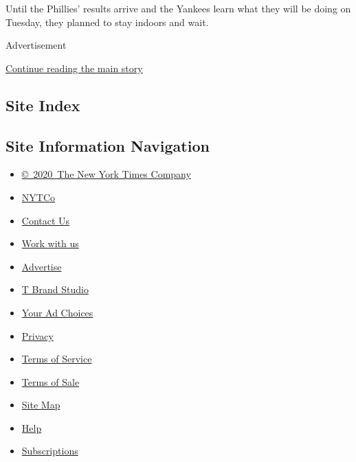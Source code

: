 Until the Phillies' results arrive and the Yankees learn what they will
be doing on Tuesday, they planned to stay indoors and wait.

Advertisement

\protect\hyperlink{after-bottom}{Continue reading the main story}

\hypertarget{site-index}{%
\subsection{Site Index}\label{site-index}}

\hypertarget{site-information-navigation}{%
\subsection{Site Information
Navigation}\label{site-information-navigation}}

\begin{itemize}
\tightlist
\item
  \href{https://help.nytimes3xbfgragh.onion/hc/en-us/articles/115014792127-Copyright-notice}{©~2020~The
  New York Times Company}
\end{itemize}

\begin{itemize}
\tightlist
\item
  \href{https://www.nytco.com/}{NYTCo}
\item
  \href{https://help.nytimes3xbfgragh.onion/hc/en-us/articles/115015385887-Contact-Us}{Contact
  Us}
\item
  \href{https://www.nytco.com/careers/}{Work with us}
\item
  \href{https://nytmediakit.com/}{Advertise}
\item
  \href{http://www.tbrandstudio.com/}{T Brand Studio}
\item
  \href{https://www.nytimes3xbfgragh.onion/privacy/cookie-policy\#how-do-i-manage-trackers}{Your
  Ad Choices}
\item
  \href{https://www.nytimes3xbfgragh.onion/privacy}{Privacy}
\item
  \href{https://help.nytimes3xbfgragh.onion/hc/en-us/articles/115014893428-Terms-of-service}{Terms
  of Service}
\item
  \href{https://help.nytimes3xbfgragh.onion/hc/en-us/articles/115014893968-Terms-of-sale}{Terms
  of Sale}
\item
  \href{https://spiderbites.nytimes3xbfgragh.onion}{Site Map}
\item
  \href{https://help.nytimes3xbfgragh.onion/hc/en-us}{Help}
\item
  \href{https://www.nytimes3xbfgragh.onion/subscription?campaignId=37WXW}{Subscriptions}
\end{itemize}
